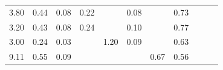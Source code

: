 \documentclass[10pt,a4paper]{article}
\begin{document}
\begin{table}
\begin{tabular}{@{}ccccccccccc@{}}
		3.80                                                         & 0.44                                                & 0.08                                                & 0.22                                                &                                                     & 0.08                                                 &                                                     & 0.73                                                  &                                                         &                                                      & \cite{Tampere}                                                        \\
		3.20                                                         & 0.43                                                & 0.08                                                & 0.24                                                &                                                     & 0.10                                                 &                                                     & 0.77                                                  &                                                         &                                                      & \cite{Tampere}                                                       \\
		3.00                                                         & 0.24                                                & 0.03                                                &                                                     & 1.20                                                & 0.09                                                 &                                                     & 0.63                                                  &                                                         &                                                      & \cite{Loes}                                                                 \\
		9.11                                                         & 0.55                                                & 0.09                                                &                                                     &                                                     &                                                      & 0.67                                                & 0.56                                                  &                                                         &                                                      & \cite{Martin2}                                                                    \\

\end{tabular}
\end{table}
\end{document}
